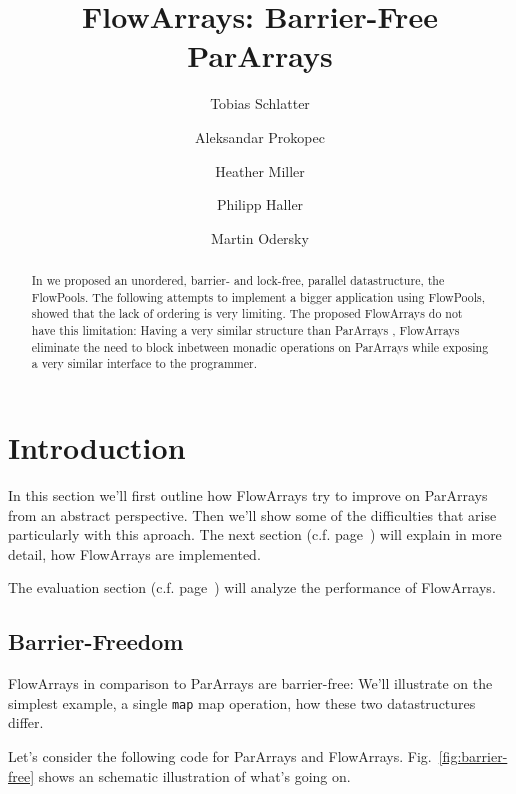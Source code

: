 \documentclass[runningheads,a4paper,fleqn]{llncs}
\begin{document}
\title{FlowArrays: Barrier-Free ParArrays}
\author{Tobias Schlatter \and Aleksandar Prokopec \and
  Heather Miller \and Philipp Haller \and Martin
  Odersky}



\graphicspath{{figs/}}

\maketitle

\begin{abstract}
  In \cite{FP12} we proposed an unordered, barrier- and lock-free,
  parallel datastructure, the FlowPools. The following attempts to
  implement a bigger application using FlowPools, showed that the lack
  of ordering is very limiting. The proposed FlowArrays do not have
  this limitation: Having a very similar structure than ParArrays
  \cite{collect11}, FlowArrays eliminate the need to block inbetween
  monadic operations on ParArrays while exposing a very similar
  interface to the programmer.
\end{abstract}

\section{Introduction}
In this section we'll first outline how FlowArrays try to improve on
ParArrays from an abstract perspective. Then we'll show some of the
difficulties that arise particularly with this aproach. The next
section (c.f. page~\pageref{sec:implementation}) will explain in more
detail, how FlowArrays are implemented.

The evaluation section (c.f. page~\pageref{sec:evaluation}) will
analyze the performance of FlowArrays.

\subsection{Barrier-Freedom}
FlowArrays in comparison to ParArrays are barrier-free: We'll
illustrate on the simplest example, a single \texttt{map} map
operation, how these two datastructures differ.

Let's consider the following code for ParArrays and
FlowArrays. Fig.~\ref{fig:barrier-free} shows an schematic
illustration of what's going on.
\end{document}
